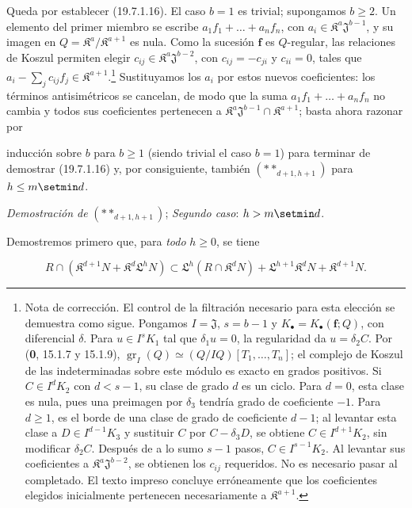 Queda por establecer (19.7.1.16). El caso $b=1$ es trivial; supongamos $b\geq2$. Un elemento del primer miembro se escribe $a_1f_1+\ldots+a_nf_n$, con $a_i\in\mathfrak K^a\mathfrak J^{b-1}$, y su imagen en $Q=\mathfrak K^a/\mathfrak K^{a+1}$ es nula. Como la sucesión $\mathbf f$ es $Q$-regular, las relaciones de Koszul permiten elegir $c_{ij}\in\mathfrak K^a\mathfrak J^{b-2}$, con $c_{ij}=-c_{ji}$ y $c_{ii}=0$, tales que $a_i-\sum_j c_{ij}f_j\in\mathfrak K^{a+1}$.\footnote{Nota de corrección. El control de la filtración necesario para esta elección se demuestra como sigue. Pongamos $I=\mathfrak J$, $s=b-1$ y $K_\bullet=K_\bullet(\mathbf f;Q)$, con diferencial $\delta$. Para $u\in I^sK_1$ tal que $\delta_1u=0$, la regularidad da $u=\delta_2C$. Por (\textbf{0}, 15.1.7 y 15.1.9), $\operatorname{gr}_I(Q)\simeq(Q/IQ)[T_1,\ldots,T_n]$; el complejo de Koszul de las indeterminadas sobre este módulo es exacto en grados positivos. Si $C\in I^dK_2$ con $d<s-1$, su clase de grado $d$ es un ciclo. Para $d=0$, esta clase es nula, pues una preimagen por $\delta_3$ tendría grado de coeficiente $-1$. Para $d\geq1$, es el borde de una clase de grado de coeficiente $d-1$; al levantar esta clase a $D\in I^{d-1}K_3$ y sustituir $C$ por $C-\delta_3D$, se obtiene $C\in I^{d+1}K_2$, sin modificar $\delta_2C$. Después de a lo sumo $s-1$ pasos, $C\in I^{s-1}K_2$. Al levantar sus coeficientes a $\mathfrak K^a\mathfrak J^{b-2}$, se obtienen los $c_{ij}$ requeridos. No es necesario pasar al completado. El texto impreso concluye erróneamente que los coeficientes elegidos inicialmente pertenecen necesariamente a $\mathfrak K^{a+1}$.} Sustituyamos los $a_i$ por estos nuevos coeficientes: los términos antisimétricos se cancelan, de modo que la suma $a_1f_1+\ldots+a_nf_n$ no cambia y todos sus coeficientes pertenecen a $\mathfrak K^a\mathfrak J^{b-1}\cap\mathfrak K^{a+1}$; basta ahora razonar por


inducción sobre $b$ para $b\geq1$ (siendo trivial el caso $b=1$) para terminar de demostrar (19.7.1.16) y, por consiguiente, también $(**_{d+1,h+1})$ para $h\leq m\setmin d$.

\begin{env}[19.7.1.18]
\label{IV.19.7.1.18}
\emph{Demostración de} $(**_{d+1,h+1})$; \emph{Segundo caso}: $h>m\setmin d$.
\end{env}

Demostremos primero que, para \emph{todo} $h\geq0$, se tiene
\begin{env}[19.7.1.19]
\label{IV.19.7.1.19}
\[
  R\cap(\mathfrak K^{d+1}N+\mathfrak K^d\mathfrak L^hN)\subset\mathfrak L^h(R\cap\mathfrak K^dN)+\mathfrak L^{h+1}\mathfrak K^dN+\mathfrak K^{d+1}N.
\]
\end{env}

